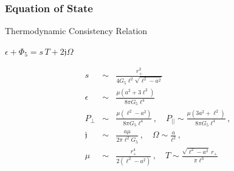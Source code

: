 \documentclass[xcolor=dvipsnames]{beamer}
\begin{document}



\begin{frame}
  \frametitle{Equation of State}

  \begin{block}{Thermodynamic Consistency Relation}
    \begin{center}
      $\epsilon + \Phi_5 = s \, T + 2\mathfrak{j}\Omega$
    \end{center}
  \end{block}

  {
    \begin{eqnarray*}
      s&\sim& \frac{r_+^3}{4 G_5 \ell^2 \sqrt{\ell^2-a^2}} \\
      \epsilon &\sim& \frac{\mu (a^2+3 \ell^2)}{8 \pi G_5 \ell^4} \\ 
      P_\perp &\sim& \frac{\mu (\ell^2-a^2) }{8 \pi G_5 \ell^4}\, , \quad P_{||} \sim \frac{\mu (3 a^2+ \ell^2)}{8 \pi G_5 \ell^4} \, , \\
      \mathfrak{j} &\sim& \frac{a \mu}{2\pi \ell^2 G_5}  \, , \quad \Omega \sim \frac{a}{\ell^2} \, , \\ 
      \mu &\sim& \frac{r_+^4}{2 (\ell^2 - a^2)} \,,\quad T \sim \frac{\sqrt{\ell^2-a^2}~r_+}{\pi \ell^3}
    \end{eqnarray*}
  }

\end{frame}
\end{document}
